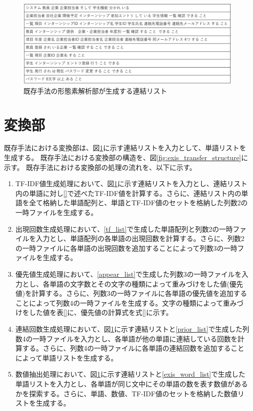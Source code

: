 \begin{figure}[tp]
    \begin{center}
        \includegraphics[width=1.0\columnwidth]{image/exis_connect_list.png}
        \caption{既存手法の形態素解析部が生成する連結リスト}
        \label{fig:exis_connect_list}
    \end{center}
\end{figure}

\section{変換部}
\label{sec:exis_transfer}
既存手法における変換部は、図\ref{fig:exis_connect_list}に示す連結リストを入力として、単語リストを生成する。
既存手法における変換部の構造を、図\ref{fig:exis_transfer_structure}に示す。
既存手法における変換部の処理の流れを、以下に示す。

\begin{enumerate}
    \item TF-IDF値生成処理において、図\ref{fig:exis_connect_list}に示す連結リストを入力とし、連結リスト内の単語に対し\ref{}で述べたTF-IDF値を計算する。さらに、連結リスト内の単語を全て格納した単語配列と、単語とTF-IDF値のセットを格納した列数2の一時ファイルを生成する。
    \label{tf_list}
    \item 出現回数生成処理において、\ref{tf_list}で生成した単語配列と列数2の一時ファイルを入力とし、単語配列の各単語の出現回数を計算する。さらに、列数2の一時ファイルに各単語の出現回数を追加することによって列数3の一時ファイルを生成する。
    \label{appear_list}
    \item 優先値生成処理において、\ref{appear_list}で生成した列数3の一時ファイルを入力とし、各単語の文字数とその文字の種類によって重みづけをした値(優先値)を計算する。さらに、列数3の一時ファイルに各単語の優先値を追加することによって列数4の一時ファイルを生成する。文字の種類によって重みづけをした値を表\ref{}に、優先値の計算式を式\ref{}に示す。
    \label{prior_list}
    \item 連結回数生成処理において、図\ref{fig:exis_connect_list}に示す連結リストと\ref{prior_list}で生成した列数4の一時ファイルを入力とし、各単語が他の単語に連結している回数を計算する。さらに、列数4の一時ファイルに各単語の連結回数を追加することによって単語リストを生成する。
    \label{exis_word_list}
    \item 数値抽出処理において、図\ref{fig:exis_connect_list}に示す連結リストと\ref{exis_word_list}で生成した単語リストを入力とし、各単語が同じ文中にその単語の数を表す数値があるかを探索する。さらに、単語、数値、TF-IDF値のセットを格納した数値リストを生成する。
\end{enumerate}

